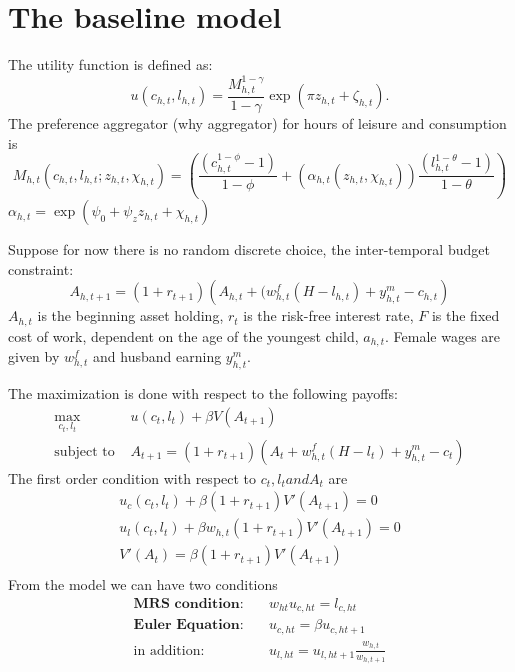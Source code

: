 \section{The baseline model}

The utility function is defined as:
\[ u(c_{h,t},l_{h,t}) = \frac{M^{1-\gamma}_{h,t}}{1 - \gamma} \exp{( \pi z_{h,t} + \zeta_{h,t} )} .\]
The preference aggregator (why aggregator) for hours of leisure and consumption is
\[ M_{h,t}(c_{h,t},l_{h,t};z_{h,t},\chi_{h,t}) = \left( \frac{(c_{h,t}^{1 - \phi} - 1)}{1 - \phi} + (\alpha_{h,t}(z_{h,t},\chi_{h,t})) \frac{(l_{h,t}^{1 - \theta} -1)}{ 1 - \theta}\right) \]
$\alpha_{h,t}= \exp{(\psi_0 + \psi_z z_{h,t} + \chi_{h,t})}$

Suppose for now there is no random discrete choice, the inter-temporal budget constraint:
\[ A_{h,t+1} = (1 + r_{t+1}) \left( A_{h,t} + (w_{h,t}^f(H-l_{h,t}) + y_{h,t}^m - c_{h,t} \right)\]
$A_{h,t}$ is the beginning asset holding, $r_t$ is the risk-free interest rate, $F$ is the fixed cost of work, dependent on the age of the youngest child, $a_{h,t}$. Female wages are given by $w_{h,t}^f$ and husband earning $y_{h,t}^m$.

The maximization is done with respect to the following payoffs:
\[\begin{split} \max_{c_t,l_t} & u(c_t,l_t) + \beta V(A_{t+1}) \\
\text{subject to } & A_{t+1} = (1 + r_{t+1}) \left( A_{t} + w_{h,t}^f(H-l_{t}) + y_{h,t}^m - c_{t} \right)
\end{split}\]
The first order condition with respect to $c_t, l_t and A_t$ are \[ \begin{split}
  u_c(c_t,l_t) + \beta (1+r_{t+1}) V'(A_{t+1}) = 0 \\
  u_l(c_t,l_t) + \beta w_{h,t} (1+r_{t+1}) V'(A_{t+1}) = 0 \\
  V'(A_t) = \beta (1+r_{t+1}) V'(A_{t+1}) \\
\end{split} \]
From the model we can have two conditions
\[ \begin{split}
  \textbf{MRS condition:}& \quad w_{ht} u_{c,ht} = l_{c,ht}\\
  \textbf{Euler Equation:}& \quad u_{c,ht} = \beta u_{c,ht+1}\\
  \text{in addition:}& \quad u_{l,ht} = u_{l,ht+1} \frac{w_{h,t}}{w_{h,t+1}}
\end{split} \]


